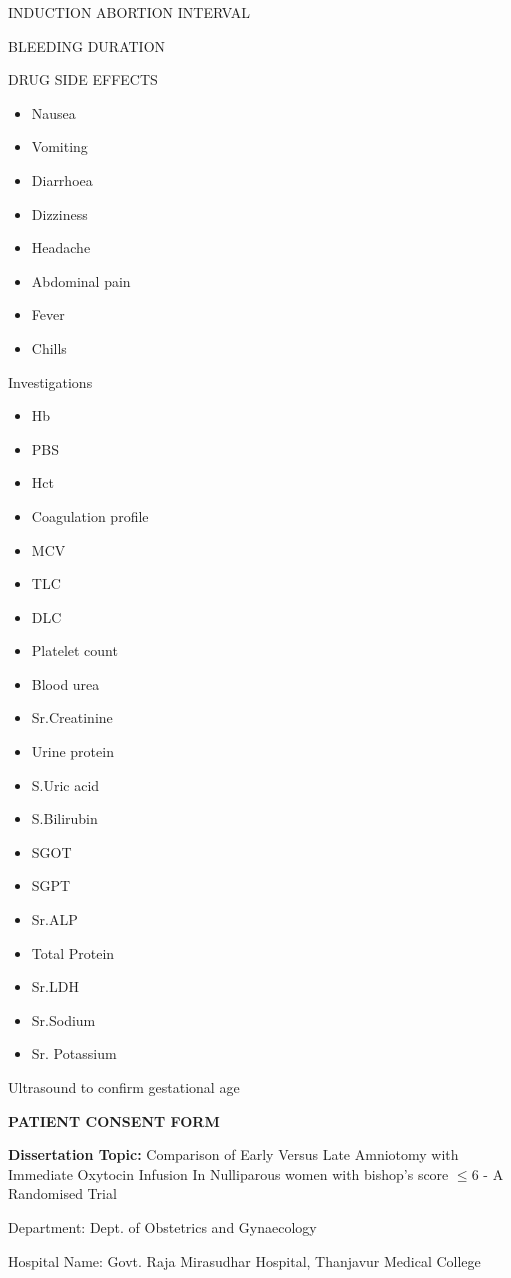 \documentclass[14pt]{extarticle}
\def\study{Comparison of Early Versus Late Amniotomy with Immediate Oxytocin Infusion In Nulliparous women with bishop’s score $\leq$6 - A Randomised Trial}
\begin{document}
INDUCTION ABORTION INTERVAL

BLEEDING DURATION

DRUG SIDE EFFECTS

\begin{itemize}
\item Nausea
\item Vomiting
\item Diarrhoea
\item Dizziness
\item Headache
\item Abdominal pain
\item Fever
\item Chills
\end{itemize}

Investigations

\begin{itemize}
\item Hb
\item PBS
\item Hct
\item Coagulation profile
\item MCV
\item TLC
\item DLC
\item Platelet count
\item Blood urea
\item Sr.Creatinine
\item Urine protein
\item S.Uric acid
\item S.Bilirubin
\item SGOT
\item SGPT
\item Sr.ALP
\item Total Protein
\item Sr.LDH
\item Sr.Sodium
\item Sr. Potassium
\end{itemize}

Ultrasound to confirm gestational age

\newpage

\begin{center}
    \textbf{PATIENT CONSENT FORM}
\end{center}

\small
\textbf{Dissertation Topic:}
\study

Department: Dept. of Obstetrics and Gynaecology

Hospital Name: Govt. Raja Mirasudhar Hospital, Thanjavur Medical College 
\end{document}

